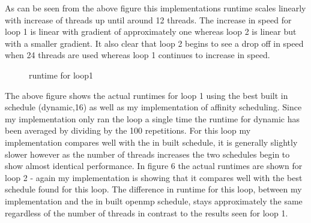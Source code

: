 \documentclass[12pt]{article} %
\begin{document}
As can be seen from the above figure this implementations runtime scales linearly with increase of threads up until around 12 threads. The increase in speed for loop 1 is linear with gradient of approximately one whereas loop 2 is linear but with a smaller gradient. It also clear that loop 2 begins to see a drop off in speed when 24 threads are used whereas loop 1 continues to increase in speed. 


\begin{figure}[H] %
\caption{runtime for loop1}
\label{fig:speciation}
\end{figure}

The above figure shows the actual runtimes for loop 1 using the best built in schedule (dynamic,16) as well as my implementation of affinity scheduling. Since my implementation only ran the loop a single time the runtime for dynamic has been averaged by dividing by the 100 repetitions. For this loop my implementation compares well with the in built schedule, it is generally slightly slower however as the number of threads increases the two schedules begin to show almost identical performance. In figure 6 the actual runtimes are shown for loop 2 - again my implementation is showing  that it compares well with the best schedule found for this loop. The difference in runtime for this loop, between my implementation and the in built openmp schedule, stays approximately the same regardless of the number of threads in contrast to the results seen for loop 1.
\end{document}
